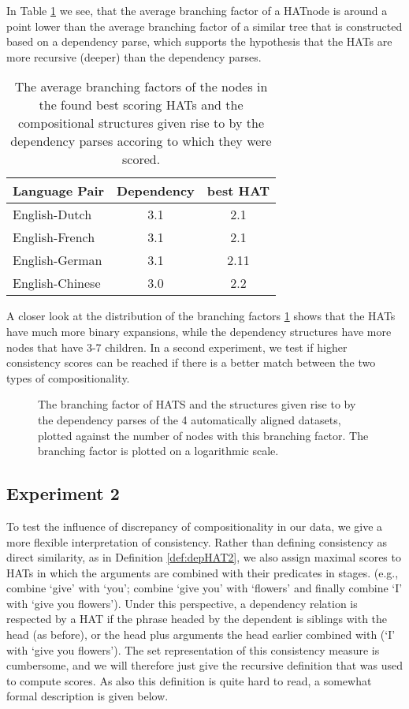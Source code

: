 In Table \ref{tab:branching} we see, that the average branching factor of a HATnode is around a point lower than the average branching factor of a similar tree that is constructed based on a dependency parse, which supports the hypothesis that the HATs are more recursive (deeper) than the dependency parses.

\begin{table}[!ht]
\centering
\begin{tabular}{|l|c|c|}
\hline\textbf{Language Pair} & \textbf{Dependency} &\textbf{best HAT}\\
\hline \hline
English-Dutch & 3.1 & 2.1 \\
\hline
English-French & 3.1 & 2.1 \\
\hline
English-German & 3.1 & 2.11 \\
\hline
English-Chinese & 3.0 & 2.2\\
\hline
\end{tabular}
\caption{The average branching factors of the nodes in the found best scoring HATs and the compositional structures given rise to by the dependency parses accoring to which they were scored.}\label{tab:branching}
\end{table}

A closer look at the distribution of the branching factors \ref{fig:branching} shows that the HATs have much more binary expansions, while the dependency structures have more nodes that have 3-7 children. In a second experiment, we test if higher consistency scores can be reached if there is a better match between the two types of compositionality.

\begin{figure}[!ht]

\caption{The branching factor of HATS and the structures given rise to by the dependency parses of the 4 automatically aligned datasets, plotted against the number of nodes with this branching factor. The branching factor is plotted on a logarithmic scale.}\label{fig:branching}
\end{figure}


\subsection{Experiment 2}

To test the influence of discrepancy of compositionality in our data, we give a more flexible interpretation of consistency. Rather than defining consistency as direct similarity, as in Definition \ref{def:depHAT2}, we also assign maximal scores to HATs in which the arguments are combined with their predicates in stages. (e.g., combine `give' with `you'; combine `give you' with `flowers' and finally combine `I' with `give you flowers'). Under this perspective, a dependency relation is respected by a HAT if the phrase headed by the dependent is siblings with the head (as before), or the head plus arguments the head earlier combined with (`I' with `give you flowers'). The set representation of this consistency measure is cumbersome, and we will therefore just give the recursive definition that was used to compute scores. As also this definition is quite hard to read, a somewhat formal description is given below.

